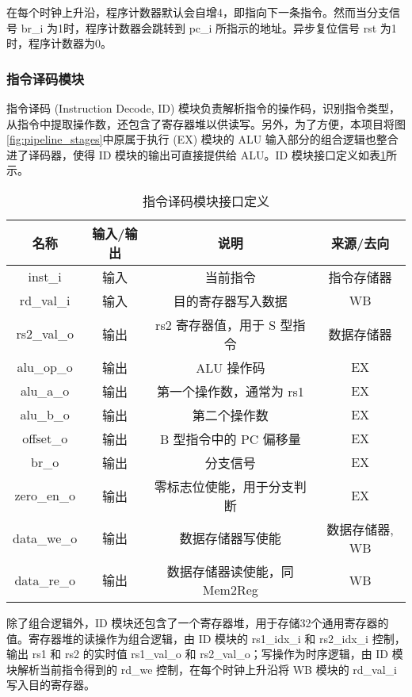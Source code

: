 \documentclass[lang=zh]{sjtuarticle}	%
\begin{document}
在每个时钟上升沿，程序计数器默认会自增4，即指向下一条指令。然而当分支信号 br\_i 为1时，程序计数器会跳转到 pc\_i 所指示的地址。异步复位信号 rst 为1时，程序计数器为0。

\subsubsection{指令译码模块}
\label{sec:single_id}

指令译码 (Instruction Decode, ID) 模块负责解析指令的操作码，识别指令类型，从指令中提取操作数，还包含了寄存器堆以供读写。另外，为了方便，本项目将图\ref{fig:pipeline_stages}中原属于执行 (EX) 模块的 ALU 输入部分的组合逻辑也整合进了译码器，使得 ID 模块的输出可直接提供给 ALU。ID 模块接口定义如表\ref{tab:single_id_io}所示。

\begin{table}[!htp]
	\centering
	\caption{指令译码模块接口定义}
	\label{tab:single_id_io}
	\begin{tabular}{|c|c|c|c|}
		\hline
		名称 & 输入/输出 & 说明 & 来源/去向 \\
		\hline
		inst\_i & 输入 & 当前指令 & 指令存储器 \\
		\hline
		rd\_val\_i & 输入 & 目的寄存器写入数据 & WB \\
		\hline
		rs2\_val\_o & 输出 & rs2 寄存器值，用于 S 型指令 & 数据存储器 \\
		\hline
		alu\_op\_o & 输出 & ALU 操作码 & EX \\
		\hline
		alu\_a\_o & 输出 & 第一个操作数，通常为 rs1 & EX \\
		\hline
		alu\_b\_o & 输出 & 第二个操作数 & EX \\
		\hline
		offset\_o & 输出 & B 型指令中的 PC 偏移量 & EX \\
		\hline
		br\_o & 输出 & 分支信号 & EX \\
		\hline
		zero\_en\_o & 输出 & 零标志位使能，用于分支判断 & EX \\
		\hline
		data\_we\_o & 输出 & 数据存储器写使能 & 数据存储器, WB \\
		\hline
		data\_re\_o & 输出 & 数据存储器读使能，同Mem2Reg\cite{COD} & WB \\
		\hline
	\end{tabular}
\end{table}

除了组合逻辑外，ID 模块还包含了一个寄存器堆，用于存储32个通用寄存器的值。寄存器堆的读操作为组合逻辑，由 ID 模块的 rs1\_idx\_i 和 rs2\_idx\_i 控制，输出 rs1 和 rs2 的实时值 rs1\_val\_o 和 rs2\_val\_o；写操作为时序逻辑，由 ID 模块解析当前指令得到的 rd\_we 控制，在每个时钟上升沿将 WB 模块的 rd\_val\_i 写入目的寄存器。
\end{document}
